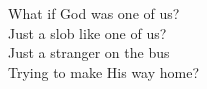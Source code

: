 What if God was one of us? \\
Just a slob like one of us? \\
Just a stranger on the bus \\
Trying to make His way home?
